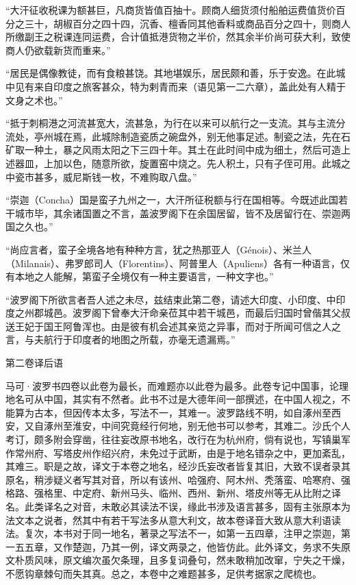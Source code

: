 \documentclass[12pt,UTF8]{ctexbook}
\begin{document}
“大汗征收税课为额甚巨，凡商货皆值百抽十。顾商人细货须付船舶运费值货价百分之三十，胡椒百分之四十四，沉香、檀香同其他香料或商品百分之四十，则商人所缴副王之税课连同运费，合计值抵港货物之半价，然其余半价尚可获大利，致使商人仍欲载新货而重来。”

“居民是偶像教徒，而有食粮甚饶。其地堪娱乐，居民颇和善，乐于安逸。在此城中见有来自印度之旅客甚众，特为剌青而来（语见第一二六章），盖此处有人精于文身之术也。”

“抵于刺桐港之河流甚宽大，流甚急，为行在以来可以航行之一支流。其与主流分流处，亭州城在焉，此城除制造瓷质之碗盘外，别无他事足述。制瓷之法，先在石矿取一种土，暴之风雨太阳之下三四十年。其土在此时间中成为细土，然后可造上述器皿，上加以色，随意所欲，旋置窑中烧之。先人积土，只有子侄可用。此城之中瓷市甚多，威尼斯钱一枚，不难购取八盘。”

“崇迦（Concha）国是蛮子九州之一，大汗所征税额与行在国相等。今既述此国若干城市毕，其余诸国置之不言，盖波罗阁下在余国居留，皆不及居留行在、崇迦两国之久也。”

“尚应言者，蛮子全境各地有种种方言，犹之热那亚人（Génois）、米兰人（Milanais）、弗罗郎司人（Florentins）、阿普里人（Apuliens）各有一种语言，仅有本地之人能解，第蛮子全境仅有一种主要语言，一种文字也。”

“波罗阁下所欲言者吾人述之未尽，兹结束此第二卷，请述大印度、小印度、中印度之州郡城邑。波罗阁下曾奉大汗命亲莅其中若干城邑，而最后归国时曾偕其父叔送王妃于国王阿鲁浑也。由是彼有机会述其亲览之异事，而对于所闻可信之人之言，与夫航行于印度者的地图之所载，亦毫无遗漏焉。”

第二卷译后语

马可·波罗书四卷以此卷为最长，而难题亦以此卷为最多。此卷专记中国事，论理地名可从中国，其实有不然者。此书不过是大德年间一部撰述，在中国人视之，不能算为古本，但因传本太多，写法不一，其难一。波罗路线不明，如自涿州至西安，又自涿州至淮安，中间究竟经行何地，别无他书可以参考，其难二。沙氏个人考订，颇多附会穿凿，往往妄改原书地名，改行在为杭州府，倘有说也，写镇巢军作常州府、写塔皮州作绍兴府，未免过于武断，由是于地名错杂之中，更加紊乱，其难三。职是之故，译文于本卷之地名，经沙氏妄改者皆复其旧，大致不误者录其原名，稍涉疑义者写其对音，所以有该州、哈强府、阿木州、秃落蛮、哈寒府、强格路、强格里、中定府、新州马头、临州、西州、新州、塔皮州等无从比附之译名。此类译名之对音，未敢必其读法不误，缘此书涉及语言甚多，固有主张原本为法文本之说者，然其中有若干写法多从意大利文，故本卷译音大致从意大利语读法。复次，本书对于同一地名，著录之写法不一，如第一五四章，注甲之崇迦，第一五五章，又作楚迦，乃其一例，译文两录之，他皆仿此。此外译文，务求不失原文朴质风味，原文编次虽欠条理，且多复词叠句，然未敢稍加改窜，宁失之干燥，不愿钩章棘句而失其真。总之，本卷中之难题甚多，足供考据家之爬梳也。
\end{document}
